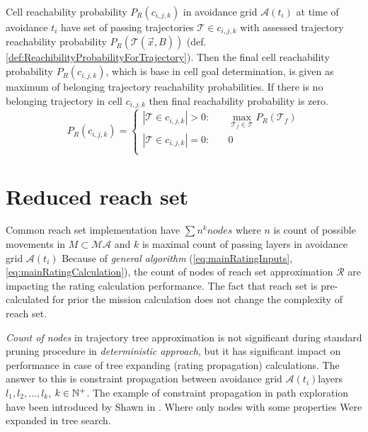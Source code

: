 \begin{definition}{Cell reachability probability}\label{def:cellReachibilityProbability} $P_R(c_{i,j,k})$ in avoidance grid $\mathscr{A}(t_i)$ at time of avoidance $t_i$ have set of passing trajectories $\mathscr{T}\in c_{i,j,k}$ with assessed trajectory reachability probability $P_R(\mathscr{T}(\vec{x},B))$ (def. \ref{def:ReachibilityProbabilityForTrajectory}). Then the final cell reachability probability $P_R(c_{i,j,k})$, which is base in cell goal determination, is given as maximum of belonging trajectory reachability probabilities. If there is no belonging trajectory in cell $c_{i,j,k}$ then final reachability probability is zero. 
    \begin{equation}\label{eq:CellReachibilityGeneral}
        P_R(c_{i,j,k}) = 
        \begin{cases}
            |\mathscr{T}\in c_{i,j,k}| > 0 : \quad& \underset{\mathscr{T}_f\in\mathscr{T}}{\max} P_R(\mathscr{T}_f) \\
            |\mathscr{T}\in c_{i,j,k}| = 0 : & 0\\
        \end{cases}
    \end{equation}
\end{definition}

\section{Reduced reach set}
\noindent Common reach set implementation have $\sum n^k nodes$ where $n$ is count of possible movements in $M\subset\mathscr{MA}$ and $k$ is maximal count of passing layers in avoidance grid $\mathscr{A}(t_i)$ Because of \emph{general algorithm} (\ref{eq:mainRatingInputs},\ref{eq:mainRatingCalculation}), the count of nodes of reach set approximation $\mathscr{R}$ are impacting the rating calculation performance. The fact that reach set is pre-calculated for prior the mission calculation does not change the complexity of reach set. 

\emph{Count of nodes} in trajectory tree approximation is not significant during standard pruning procedure in \emph{deterministic approach}, but it has significant impact on performance in case of tree expanding (rating propagation) calculations. The answer to this is constraint propagation between avoidance grid $\mathscr{A}(t_i) $layers $l_1,l_2,\dots,l_k$, $k\in\mathbb{N}^+$. The example of constraint propagation in path exploration have been introduced by Shawn in \cite{shaw1998using}. Where only nodes with some properties Were expanded in tree search. 

